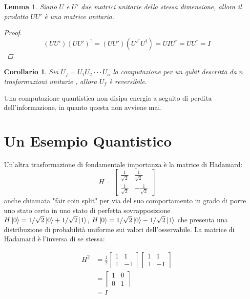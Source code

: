 \documentclass[12pt,a4paper,openright]{report}
\newtheorem{mylem}{Lemma}
\newtheorem*{mycor}{Corollario}
\begin{document}
\begin{mylem}
    Siano $U$ e $U'$ due matrici unitarie della stessa dimensione, allora il prodotto $UU'$ è una matrice unitaria.
    \begin{proof}
        \[
            (UU')(UU')^{\dag}=(UU')({U'}^{\dag}{U}^{\dag}) = UIU^{\dag} = UU^{\dag} = I
        \]
    \end{proof}
\end{mylem} 
\begin{mycor}
    Sia $U_f=U_1U_2 \cdot\cdot\cdot U_n$ la computazione per un qubit descritta da $n$ trasformazioni unitarie , allora $U_f$ è reversibile. 
\end{mycor}
Una computazione quantistica non disipa energia a seguito di perdita dell'informazione, in quanto questa non avviene mai. 
\section{Un Esempio Quantistico}

Un'altra trasformazione di fondamentale importanza è la matrice di Hadamard:
\[
    H=\begin{bmatrix}
        \frac{1}{\sqrt2} & \frac{1}{\sqrt2} \\
        \frac{1}{\sqrt2} & -\frac{1}{\sqrt2} 
    \end{bmatrix}
\] 
anche chiamata "fair coin split" per via del suo comportamento in grado di porre uno stato certo in uno stato di perfetta sovrapposizione 
$H\ket0 = 1/\sqrt2\ket0 + 1/\sqrt2\ket1$, $H\ket0 = 1/\sqrt2\ket0 - 1/\sqrt2\ket1$ che presenta una distribuzione di probabilità uniforme
sui valori dell'osservabile.
La matrice di Hadamard è l'inversa di se stessa:
\begin{center}
    \begin{align*}
        H^2 &= \frac{1}{2}\begin{bmatrix}
            1 & 1 \\
            1 & -1 
        \end{bmatrix}\begin{bmatrix}
            1 & 1 \\
            1 & -1 
        \end{bmatrix}\\
        &= \begin{bmatrix}
            1 & 0\\
            0 & 1
        \end{bmatrix}\\ 
        &= I
    \end{align*}
\end{center}
 
\end{document}
